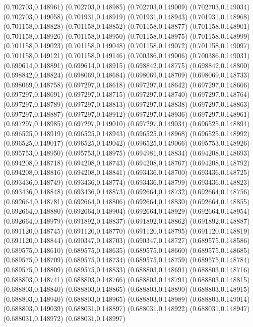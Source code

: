 (0.702703,0.148961)
(0.702703,0.148985)
(0.702703,0.149009)
(0.702703,0.149034)
(0.702703,0.149058)
(0.701931,0.148919)
(0.701931,0.148943)
(0.701931,0.148968)
(0.701158,0.148828)
(0.701158,0.148852)
(0.701158,0.148877)
(0.701158,0.148901)
(0.701158,0.148926)
(0.701158,0.148950)
(0.701158,0.148975)
(0.701158,0.148999)
(0.701158,0.149023)
(0.701158,0.149048)
(0.701158,0.149072)
(0.701158,0.149097)
(0.701158,0.149121)
(0.701158,0.149146)
(0.700386,0.149006)
(0.700386,0.149031)
(0.699614,0.148891)
(0.699614,0.148915)
(0.698842,0.148775)
(0.698842,0.148800)
(0.698842,0.148824)
(0.698069,0.148684)
(0.698069,0.148709)
(0.698069,0.148733)
(0.698069,0.148758)
(0.697297,0.148618)
(0.697297,0.148642)
(0.697297,0.148666)
(0.697297,0.148691)
(0.697297,0.148715)
(0.697297,0.148740)
(0.697297,0.148764)
(0.697297,0.148789)
(0.697297,0.148813)
(0.697297,0.148838)
(0.697297,0.148863)
(0.697297,0.148887)
(0.697297,0.148912)
(0.697297,0.148936)
(0.697297,0.148961)
(0.697297,0.148985)
(0.697297,0.149010)
(0.697297,0.149034)
(0.696525,0.148894)
(0.696525,0.148919)
(0.696525,0.148943)
(0.696525,0.148968)
(0.696525,0.148992)
(0.696525,0.149017)
(0.696525,0.149042)
(0.696525,0.149066)
(0.695753,0.148926)
(0.695753,0.148950)
(0.695753,0.148975)
(0.694981,0.148834)
(0.694208,0.148693)
(0.694208,0.148718)
(0.694208,0.148743)
(0.694208,0.148767)
(0.694208,0.148792)
(0.694208,0.148816)
(0.694208,0.148841)
(0.693436,0.148700)
(0.693436,0.148725)
(0.693436,0.148749)
(0.693436,0.148774)
(0.693436,0.148799)
(0.693436,0.148823)
(0.693436,0.148848)
(0.693436,0.148873)
(0.692664,0.148732)
(0.692664,0.148756)
(0.692664,0.148781)
(0.692664,0.148806)
(0.692664,0.148830)
(0.692664,0.148855)
(0.692664,0.148880)
(0.692664,0.148904)
(0.692664,0.148929)
(0.692664,0.148954)
(0.692664,0.148979)
(0.691892,0.148837)
(0.691892,0.148862)
(0.691892,0.148887)
(0.691120,0.148745)
(0.691120,0.148770)
(0.691120,0.148795)
(0.691120,0.148819)
(0.691120,0.148844)
(0.690347,0.148703)
(0.690347,0.148727)
(0.689575,0.148586)
(0.689575,0.148610)
(0.689575,0.148635)
(0.689575,0.148660)
(0.689575,0.148685)
(0.689575,0.148709)
(0.689575,0.148734)
(0.689575,0.148759)
(0.689575,0.148784)
(0.689575,0.148809)
(0.689575,0.148833)
(0.688803,0.148691)
(0.688803,0.148716)
(0.688803,0.148741)
(0.688803,0.148766)
(0.688803,0.148791)
(0.688803,0.148815)
(0.688803,0.148840)
(0.688803,0.148865)
(0.688803,0.148890)
(0.688803,0.148915)
(0.688803,0.148940)
(0.688803,0.148965)
(0.688803,0.148989)
(0.688803,0.149014)
(0.688803,0.149039)
(0.688031,0.148897)
(0.688031,0.148922)
(0.688031,0.148947)
(0.688031,0.148972)
(0.688031,0.148997)
